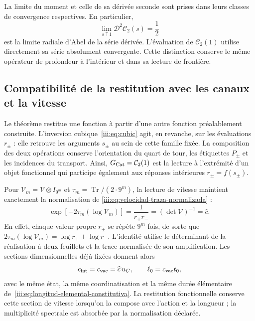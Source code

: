 La limite du moment et celle de sa dérivée seconde sont prises
dans leurs classes de convergence respectives. En particulier,
\[
 \lim_{s\uparrow1}\mathcal D^2\mathcal C_2(s)=\frac12
\]
est la limite radiale d’Abel de la série dérivée. L’évaluation
de $\mathcal C_2(1)$ utilise directement sa série absolument
convergente. Cette distinction conserve le même opérateur de profondeur
à l’intérieur et dans sa lecture de frontière.

\subsection{Compatibilité de la restitution avec les canaux et la vitesse}
\label{iii:sec:restitucion-canales-velocidad}

Le théorème restitue une fonction à partir d’une autre fonction préalablement
construite. L’inversion cubique~\eqref{iii:eq:cubic} agit, en revanche,
sur les évaluations $r_\pm$ : elle retrouve les arguments $s_\pm$
au sein de cette famille fixée. La composition des deux opérations
conserve l’orientation du quart de tour, les étiquettes $P_\pm$
et les incidences du transport. Ainsi, $G_{\rm Cat}=\mathcal C_2(1)$
est la lecture à l’extrémité d’un objet fonctionnel qui participe également
aux réponses intérieures $r_\pm=f(s_\pm)$.

Pour $\mathcal V_m=\mathcal V\otimes I_{9^m}$ et
$\tau_m=\operatorname{Tr}/(2\cdot9^m)$, la lecture de vitesse
maintient exactement la normalisation de
\eqref{iii:eq:velocidad-traza-normalizada} :
\begin{equation}
 \exp[-2\tau_m(\log\mathcal V_m)]
   =\frac1{r_+r_-}
   =(\det\mathcal V)^{-1}=\widehat c.
 \label{iii:eq:restitucion-velocidad-normalizada}
\end{equation}
En effet, chaque valeur propre $r_\pm$ se répète $9^m$ fois, de sorte
que $2\tau_m(\log\mathcal V_m)=\log r_++\log r_-$.
L’identité utilise le déterminant de la réalisation à deux feuillets
et la trace normalisée de son amplification. Les sections
dimensionnelles déjà fixées donnent alors
\[
 c_{\rm int}=c_{\rm vac}=\widehat c\,u_C,
 \qquad \ell_0=c_{\rm vac}t_0,
\]
avec le même état, la même coordinatisation et la même durée élémentaire
de~\eqref{iii:eq:longitud-elemental-constitutiva}.
La restitution fonctionnelle conserve cette section de vitesse lorsqu’on
la compose avec l’action et la longueur ; la multiplicité spectrale
est absorbée par la normalisation déclarée.
